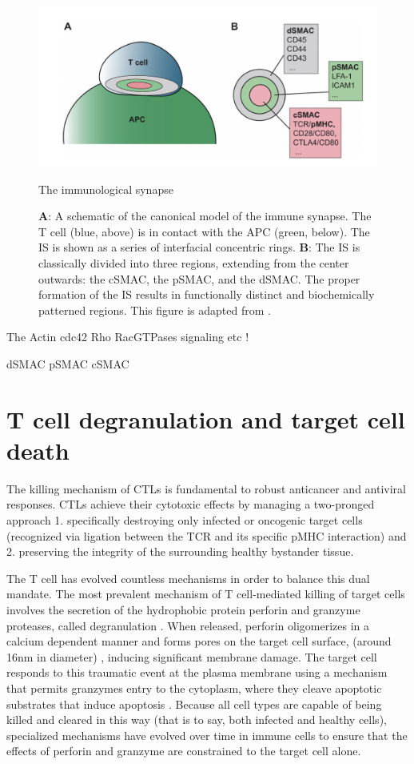 \begin{figure}[htbp]
	\centering
	\includegraphics[width=\textwidth]{../figures/chapter1/immunesynapse.png}
	\caption{The immunological synapse}
	\caption*{\textbf{A}: A schematic of the canonical model of the immune synapse. The T cell (blue, above) is in contact with the APC (green, below). The IS is shown as a series of interfacial concentric rings.  \textbf{B}: The IS is classically divided into three regions, extending from the center outwards: the cSMAC, the pSMAC, and the dSMAC.  The proper formation of the IS results in functionally distinct and biochemically patterned regions.  This figure is adapted from \cite{Yu2013}.}
	\label{fig:immunesynapse}
\end{figure}

The 
Actin cdc42 Rho RacGTPases signaling etc !

dSMAC
pSMAC
cSMAC


\section{T cell degranulation and target cell death}
The killing mechanism of CTLs is fundamental to robust anticancer and antiviral responses.  CTLs achieve their cytotoxic effects by managing a two-pronged approach 1. specifically destroying only infected or oncogenic target cells (recognized via ligation between the TCR and its specific pMHC interaction) and 2. preserving the integrity of the surrounding healthy bystander tissue. 

The T cell has evolved countless mechanisms in order to balance this dual mandate. The most prevalent mechanism of T cell-mediated killing of target cells involves the secretion of the hydrophobic protein perforin and granzyme proteases, called degranulation \cite{Dustin2010, Stinchcombe2007}. When released, perforin oligomerizes in a calcium dependent manner \cite{Law2010} and forms pores on the target cell surface, (around 16nm in diameter) \cite{Cartwright2014}, inducing significant membrane damage. The target cell responds to this traumatic event at the plasma membrane using a mechanism that permits granzymes entry to the cytoplasm, where they cleave apoptotic substrates that induce apoptosis \cite{Keefe2005}. Because all cell types are capable of being killed and cleared in this way (that is to say, both infected and healthy cells),  specialized mechanisms have evolved over time in immune cells to ensure that the effects of perforin and granzyme are constrained to the target cell alone.  

